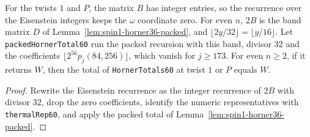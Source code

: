 \begin{lemma}
  \label{lem:spin1-horner60-packed}
  \leanok
  For the twists \(1\) and \(P\), the matrix \(B\) has integer entries, so the recurrence over
  the Eisenstein integers keeps the \(\omega\) coordinate zero. For even \(n\), \(2B\) is the
  band matrix \(D\) of Lemma~\ref{lem:spin1-horner36-packed}, and
  \(\lfloor 2y/32\rfloor = \lfloor y/16\rfloor\). Let \texttt{packedHornerTotal60} run the
  packed recursion with this band, divisor \(32\) and the coefficients
  \(\lfloor 2^{56}p_j(84,256)\rfloor\), which vanish for \(j \ge 173\). For even \(n \ge 2\),
  if it returns \(W\), then the total of \texttt{HornerTotals60} at twist \(1\) or \(P\)
  equals \(W\).
\end{lemma}
\begin{proof}
  \leanok
  Rewrite the Eisenstein recurrence as the integer recurrence of \(2B\) with divisor \(32\),
  drop the zero coefficients, identify the numeric representatives with
  \texttt{thermalRep60}, and apply the packed total of
  Lemma~\ref{lem:spin1-horner36-packed}.
\end{proof}

